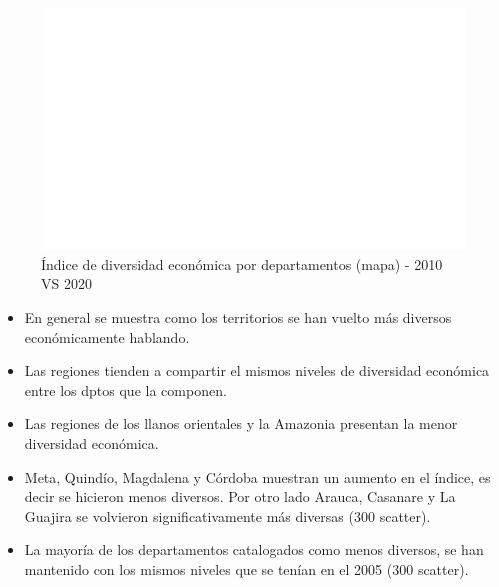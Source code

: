     \begin{figure}[H]
        \caption{Índice de diversidad económica por departamentos (mapa) - 2010 VS 2020 \label{map_result_2} }
        \begin{center}
        \includegraphics[width=\textwidth,keepaspectratio]{img/var_300_map.png}
        \end{center}
    \end{figure}
            \begin{itemize}
                    \item En general se muestra como los territorios se han vuelto más diversos económicamente hablando.
                    \item Las regiones tienden a compartir el mismos niveles de diversidad económica entre los dptos que la componen.
                    \item Las regiones de los llanos orientales y la Amazonia presentan la menor diversidad económica.
                    \item Meta, Quindío, Magdalena y Córdoba muestran un aumento en el índice, es decir se hicieron menos diversos. Por otro lado Arauca, Casanare y La Guajira se volvieron significativamente más diversas (300 scatter).
                    \item La mayoría de los departamentos catalogados como menos diversos, se han mantenido con los mismos niveles que se tenían en el 2005 (300 scatter).
                    \end{itemize}

